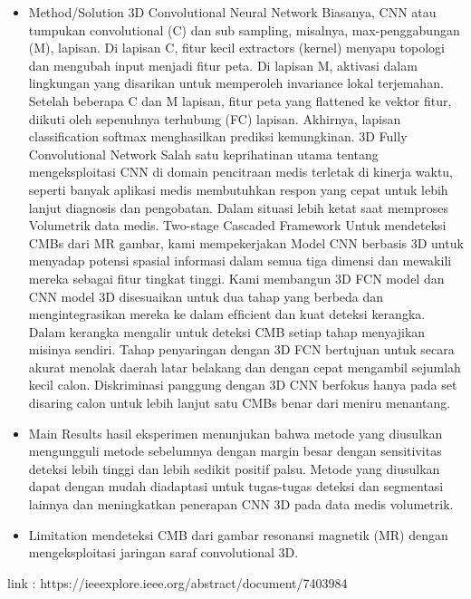 \begin{itemize}
\item Method/Solution 
\subitem 3D Convolutional Neural Network 
Biasanya, CNN atau tumpukan convolutional (C) dan sub sampling, misalnya, max-penggabungan (M), lapisan. Di lapisan C, fitur kecil extractors (kernel) menyapu topologi dan mengubah input menjadi fitur peta. Di lapisan M, aktivasi dalam lingkungan yang disarikan untuk memperoleh invariance lokal terjemahan. Setelah beberapa C dan M lapisan, fitur peta yang ﬂattened ke vektor fitur, diikuti oleh sepenuhnya terhubung (FC) lapisan. Akhirnya, lapisan classiﬁcation softmax menghasilkan prediksi kemungkinan.
\subitem 3D Fully Convolutional Network
Salah satu keprihatinan utama tentang mengeksploitasi CNN di domain pencitraan medis terletak di kinerja waktu, seperti banyak aplikasi medis membutuhkan respon yang cepat untuk lebih lanjut diagnosis dan pengobatan. Dalam situasi lebih ketat saat memproses Volumetrik data medis.
\subitem Two-stage Cascaded Framework
Untuk mendeteksi CMBs dari MR gambar, kami mempekerjakan Model CNN berbasis 3D untuk menyadap potensi spasial informasi dalam semua tiga dimensi dan mewakili mereka sebagai fitur tingkat tinggi. Kami membangun 3D FCN model dan CNN model 3D disesuaikan untuk dua tahap yang berbeda dan mengintegrasikan mereka ke dalam efﬁcient dan kuat deteksi kerangka. Dalam kerangka mengalir untuk deteksi CMB setiap tahap menyajikan misinya sendiri. Tahap penyaringan dengan 3D FCN bertujuan untuk secara akurat menolak daerah latar belakang dan dengan cepat mengambil sejumlah kecil calon. Diskriminasi panggung dengan 3D CNN berfokus hanya pada set disaring calon untuk lebih lanjut satu CMBs benar dari meniru menantang. 

\item Main Results
hasil eksperimen menunjukan bahwa metode yang diusulkan mengungguli metode sebelumnya dengan margin besar dengan sensitivitas deteksi lebih tinggi dan lebih sedikit positif palsu. Metode yang diusulkan dapat dengan mudah diadaptasi untuk tugas-tugas deteksi dan segmentasi lainnya dan meningkatkan penerapan CNN 3D pada data medis volumetrik.

\item Limitation 
mendeteksi CMB dari gambar resonansi magnetik (MR) dengan mengeksploitasi jaringan saraf convolutional 3D.

\end{itemize}

link : https://ieeexplore.ieee.org/abstract/document/7403984